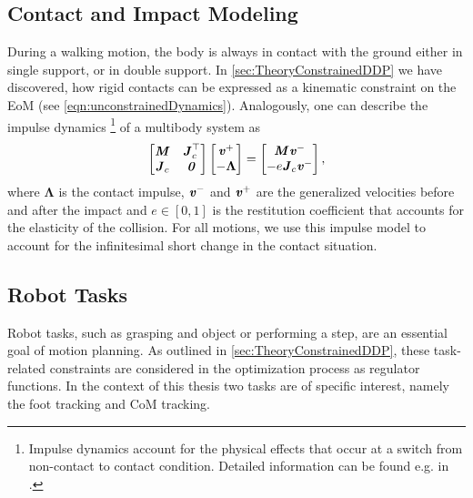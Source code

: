 \subsection{Contact and Impact Modeling}
During a walking motion, the body is always in contact with the ground either in single support, or in double support. In \cref{sec:TheoryConstrainedDDP} we have discovered, how rigid contacts can be expressed as a kinematic constraint on the \gls{EoM} (see \cref{eqn:unconstrainedDynamics}). 
Analogously, one can describe the impulse dynamics
\footnote{Impulse dynamics account for the physical effects that occur at a switch from non-contact to contact condition. Detailed information can be found e.g. in \cite{featherstone2014rigid}.} 
of a multibody system as
\begin{equation}\label{eqn:ImpulseDynamics}
\left[\begin{matrix}\bm{\mathit{M}} & \bm{\mathit{J}}^{\top}_c \\{\bm{\mathit{J}}_{c}} & \bm{\mathit{0}}\end{matrix}\right] \left[\begin{matrix} \bm{\mathit{v}}^+ \\ -\boldsymbol{\Lambda} \end{matrix}\right] = \left[\begin{matrix} \bm{\mathit{M}}\bm{\mathit{v}}^- \\ -e\bm{\mathit{J}}_c \bm{\mathit{v}}^-\end{matrix}\right],
\end{equation}
where $\boldsymbol{\Lambda}$ is the contact impulse, $\bm{\mathit{v}}^-$ and $\bm{\mathit{v}}^+$ are the generalized velocities before and after the impact and $e\in [0,1]$ is the restitution coefficient that accounts for the elasticity of the collision. For all motions, we use this impulse model to account for the infinitesimal short change in the contact situation.

\subsection{Robot Tasks}
Robot tasks, such as grasping and object or performing a step, are an essential goal of motion planning. As outlined in \cref{sec:TheoryConstrainedDDP}, these task-related constraints are considered in the optimization process as regulator functions. In the context of this thesis two tasks are of specific interest, namely the foot tracking and \gls{CoM} tracking. 

